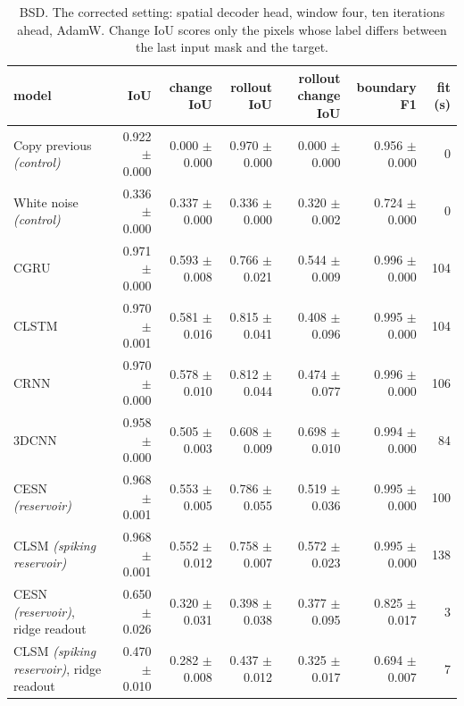 \begin{table}[t]
\centering\small
\begin{tabular}{lrrrrrr}
\toprule
model & IoU & change IoU & rollout IoU & rollout change IoU & boundary F1 & fit (s) \\
\midrule
Copy previous \emph{(control)} & 0.922 {\scriptsize$\pm$ 0.000} & 0.000 {\scriptsize$\pm$ 0.000} & 0.970 {\scriptsize$\pm$ 0.000} & 0.000 {\scriptsize$\pm$ 0.000} & 0.956 {\scriptsize$\pm$ 0.000} & 0 \\
White noise \emph{(control)} & 0.336 {\scriptsize$\pm$ 0.000} & 0.337 {\scriptsize$\pm$ 0.000} & 0.336 {\scriptsize$\pm$ 0.000} & 0.320 {\scriptsize$\pm$ 0.002} & 0.724 {\scriptsize$\pm$ 0.000} & 0 \\
CGRU & 0.971 {\scriptsize$\pm$ 0.000} & 0.593 {\scriptsize$\pm$ 0.008} & 0.766 {\scriptsize$\pm$ 0.021} & 0.544 {\scriptsize$\pm$ 0.009} & 0.996 {\scriptsize$\pm$ 0.000} & 104 \\
CLSTM & 0.970 {\scriptsize$\pm$ 0.001} & 0.581 {\scriptsize$\pm$ 0.016} & 0.815 {\scriptsize$\pm$ 0.041} & 0.408 {\scriptsize$\pm$ 0.096} & 0.995 {\scriptsize$\pm$ 0.000} & 104 \\
CRNN & 0.970 {\scriptsize$\pm$ 0.000} & 0.578 {\scriptsize$\pm$ 0.010} & 0.812 {\scriptsize$\pm$ 0.044} & 0.474 {\scriptsize$\pm$ 0.077} & 0.996 {\scriptsize$\pm$ 0.000} & 106 \\
3DCNN & 0.958 {\scriptsize$\pm$ 0.000} & 0.505 {\scriptsize$\pm$ 0.003} & 0.608 {\scriptsize$\pm$ 0.009} & 0.698 {\scriptsize$\pm$ 0.010} & 0.994 {\scriptsize$\pm$ 0.000} & 84 \\
CESN \emph{(reservoir)} & 0.968 {\scriptsize$\pm$ 0.001} & 0.553 {\scriptsize$\pm$ 0.005} & 0.786 {\scriptsize$\pm$ 0.055} & 0.519 {\scriptsize$\pm$ 0.036} & 0.995 {\scriptsize$\pm$ 0.000} & 100 \\
CLSM \emph{(spiking reservoir)} & 0.968 {\scriptsize$\pm$ 0.001} & 0.552 {\scriptsize$\pm$ 0.012} & 0.758 {\scriptsize$\pm$ 0.007} & 0.572 {\scriptsize$\pm$ 0.023} & 0.995 {\scriptsize$\pm$ 0.000} & 138 \\
CESN \emph{(reservoir)}, ridge readout & 0.650 {\scriptsize$\pm$ 0.026} & 0.320 {\scriptsize$\pm$ 0.031} & 0.398 {\scriptsize$\pm$ 0.038} & 0.377 {\scriptsize$\pm$ 0.095} & 0.825 {\scriptsize$\pm$ 0.017} & 3 \\
CLSM \emph{(spiking reservoir)}, ridge readout & 0.470 {\scriptsize$\pm$ 0.010} & 0.282 {\scriptsize$\pm$ 0.008} & 0.437 {\scriptsize$\pm$ 0.012} & 0.325 {\scriptsize$\pm$ 0.017} & 0.694 {\scriptsize$\pm$ 0.007} & 7 \\
\bottomrule
\end{tabular}
\caption{BSD. The corrected setting: spatial decoder head, window four, ten iterations ahead, AdamW. Change IoU scores only the pixels whose label differs between the last input mask and the target.}
\label{tab:blockGbsd}
\end{table}

